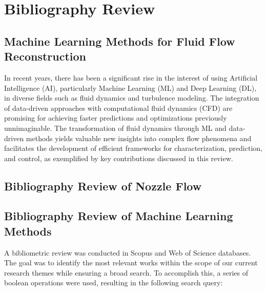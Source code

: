 

\chapter{ Bibliography Review}
\label{chap:Bibliography_Review}

\section{Machine Learning Methods for Fluid Flow Reconstruction}

In recent years, there has been a significant rise in the interest of using Artificial Intelligence (AI), particularly Machine Learning (ML) and Deep Learning (DL), in diverse fields such as fluid dynamics and turbulence modeling. The integration of data-driven approaches with computational fluid dynamics (CFD) are promising for achieving faster predictions and optimizations previously unnimaginable. The transformation of fluid dynamics through ML and data-driven methods yields valuable new insights into complex flow phenomena and facilitates the development of efficient frameworks for characterization, prediction, and control, as exemplified by key contributions discussed in this review.

\section{Bibliography Review of Nozzle Flow}

\section{Bibliography Review of Machine Learning Methods}

A bibliometric review was conducted in Scopus and Web of Science databases. The goal was to identify the most relevant works within the scope of our current research themes while ensuring a broad search. To accomplish this, a series of boolean operations were used, resulting in the following search query:

